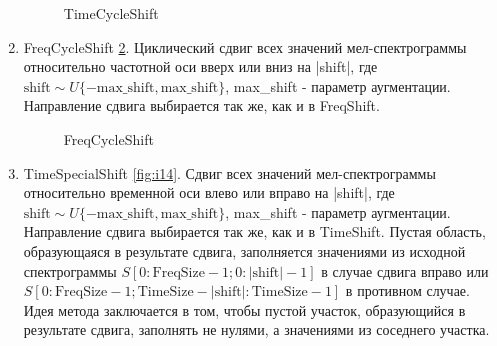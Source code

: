 \documentclass[12pt, fleqn]{article}
\begin{document}
\begin{enumerate}
\begin{figure}[h]
			\caption{TimeCycleShift}
			\label{fig:i1}
		\end{figure}
		\item FreqCycleShift \ref{fig:i13}. \newline
		Циклический сдвиг всех значений мел-спектрограммы относительно частотной оси вверх или вниз на |shift|, где $\text{shift} \sim U\{-\text{max\_shift}, \text{max\_shift}\}$, max\_shift - параметр аугментации. Направление сдвига выбирается так же, как и в FreqShift.
		\begin{figure}[h]
			\caption{FreqCycleShift}
			\label{fig:i13}
		\end{figure}
		\item TimeSpecialShift \ref{fig:i14}. \newline
		Сдвиг всех значений мел-спектрограммы относительно временной оси влево или вправо на |shift|, где $\text{shift} \sim U\{-\text{max\_shift}, \text{max\_shift}\}$, max\_shift - параметр аугментации. Направление сдвига выбирается так же, как и в TimeShift. Пустая область, образующаяся в результате сдвига, заполняется значениями из исходной спектрограммы $S[0: \text{FreqSize} - 1; 0: |\text{shift}| - 1]$ в случае сдвига вправо или $S[0: \text{FreqSize} - 1;  \text{TimeSize} - |\text{shift}|: \text{TimeSize} - 1]$ в противном случае. Идея метода заключается в том, чтобы пустой участок, образующийся в результате сдвига, заполнять не нулями, а значениями из соседнего участка.
		\begin{figure}[h]

\end{figure}
\end{enumerate}
\end{document}
